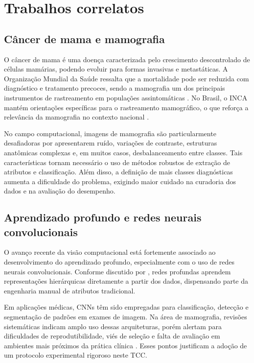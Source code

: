 \documentclass[
    12pt,
    openright,
    oneside,
    a4paper,
    english,
    brazil
]{abntex2}
\begin{document}
\section{Trabalhos correlatos}

\subsection{Câncer de mama e mamografia}

O câncer de mama é uma doença caracterizada pelo crescimento descontrolado de células mamárias, podendo evoluir para formas invasivas e metastáticas. A Organização Mundial da Saúde ressalta que a mortalidade pode ser reduzida com diagnóstico e tratamento precoces, sendo a mamografia um dos principais instrumentos de rastreamento em populações assintomáticas \cite{WHO2026BreastCancer}. No Brasil, o INCA mantém orientações específicas para o rastreamento mamográfico, o que reforça a relevância da mamografia no contexto nacional \cite{INCA2025Rastreamento}.

No campo computacional, imagens de mamografia são particularmente desafiadoras por apresentarem ruído, variações de contraste, estruturas anatômicas complexas e, em muitos casos, desbalanceamento entre classes. Tais características tornam necessário o uso de métodos robustos de extração de atributos e classificação. Além disso, a definição de mais classes diagnósticas aumenta a dificuldade do problema, exigindo maior cuidado na curadoria dos dados e na avaliação do desempenho.

\subsection{Aprendizado profundo e redes neurais convolucionais}

O avanço recente da visão computacional está fortemente associado ao desenvolvimento do aprendizado profundo, especialmente com o uso de redes neurais convolucionais. Conforme discutido por , redes profundas aprendem representações hierárquicas diretamente a partir dos dados, dispensando parte da engenharia manual de atributos tradicional.

Em aplicações médicas, CNNs têm sido empregadas para classificação, detecção e segmentação de padrões em exames de imagem. Na área de mamografia, revisões sistemáticas indicam amplo uso dessas arquiteturas, porém alertam para dificuldades de reprodutibilidade, viés de seleção e falta de avaliação em ambientes mais próximos da prática clínica \cite{Bhalla2023MammographyReview}. Esses pontos justificam a adoção de um protocolo experimental rigoroso neste TCC.
\end{document}
